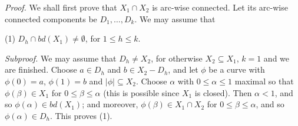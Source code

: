 \textit{Proof.} We shall first prove that $X_1 \cap X_2$ is arc-wise connected. Let its arc-wise connected components be $D_1, \dots, D_k$. We may assume that

\hspace*{12pt}(1) $D_h \cap bd(X_1) \ne \emptyset$, for $1 \le h \le k$.

\textit{Subproof.} We may assume that $D_h \ne X_2$, for otherwise $X_2 \subseteq X_1$, $k = 1$ and we are finished. Choose $a \in D_h$ and $b \in X_2 - D_h$, and let $\phi$ be a curve with $\phi(0) = a$, $\phi(1) = b$ and $|\phi| \subseteq X_2$. Choose $\alpha$ with $0 \le \alpha \le 1$ maximal so that $\phi(\beta) \in X_1$ for $0 \le \beta \le \alpha$ (this is possible since $X_1$ is closed). Then $\alpha < 1$, and so $\phi(\alpha) \in bd(X_1)$; and moreover, $\phi(\beta) \in X_1 \cap X_2$ for $0 \le \beta \le \alpha$, and so $\phi(\alpha) \in D_h$. This proves (1).
